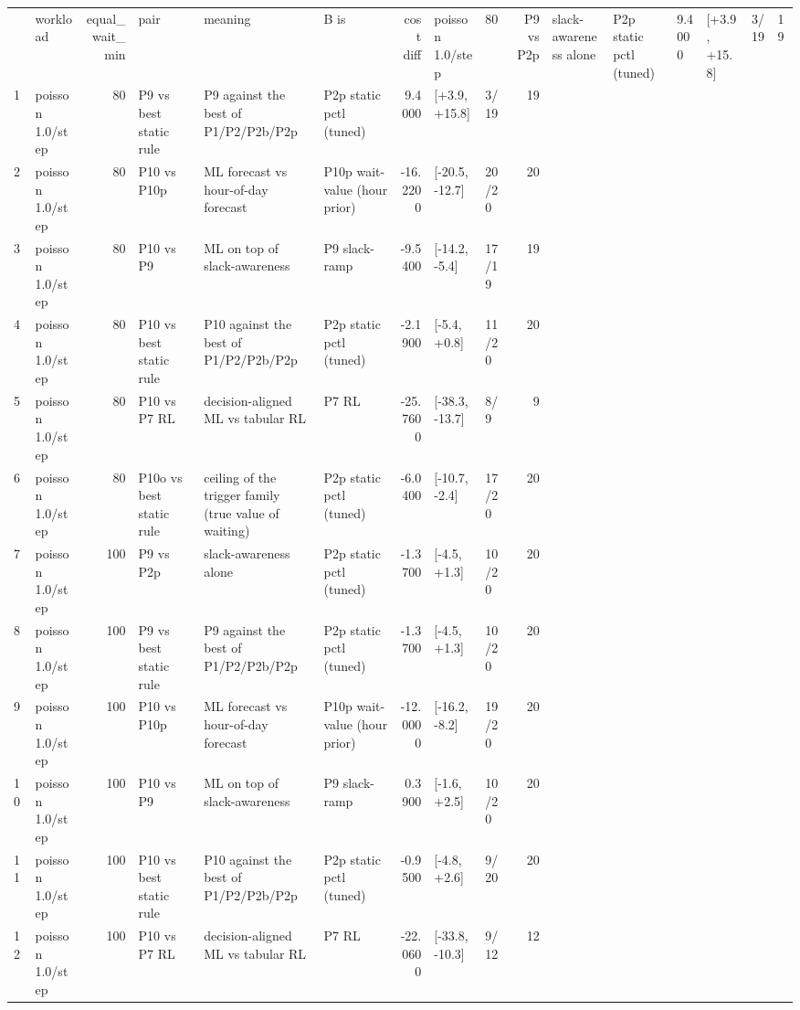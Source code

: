 \begin{tabular}{llrlllrllr}
\toprule
 & workload & equal_wait_min & pair & meaning & B is & cost diff %
 & poisson 1.0/step & 80 & P9 vs P2p & slack-awareness alone & P2p static pctl (tuned) & 9.4000 & [+3.9, +15.8] & 3/19 & 19 \\
1 & poisson 1.0/step & 80 & P9 vs best static rule & P9 against the best of P1/P2/P2b/P2p & P2p static pctl (tuned) & 9.4000 & [+3.9, +15.8] & 3/19 & 19 \\
2 & poisson 1.0/step & 80 & P10 vs P10p & ML forecast vs hour-of-day forecast & P10p wait-value (hour prior) & -16.2200 & [-20.5, -12.7] & 20/20 & 20 \\
3 & poisson 1.0/step & 80 & P10 vs P9 & ML on top of slack-awareness & P9 slack-ramp & -9.5400 & [-14.2, -5.4] & 17/19 & 19 \\
4 & poisson 1.0/step & 80 & P10 vs best static rule & P10 against the best of P1/P2/P2b/P2p & P2p static pctl (tuned) & -2.1900 & [-5.4, +0.8] & 11/20 & 20 \\
5 & poisson 1.0/step & 80 & P10 vs P7 RL & decision-aligned ML vs tabular RL & P7 RL & -25.7600 & [-38.3, -13.7] & 8/9 & 9 \\
6 & poisson 1.0/step & 80 & P10o vs best static rule & ceiling of the trigger family (true value of waiting) & P2p static pctl (tuned) & -6.0400 & [-10.7, -2.4] & 17/20 & 20 \\
7 & poisson 1.0/step & 100 & P9 vs P2p & slack-awareness alone & P2p static pctl (tuned) & -1.3700 & [-4.5, +1.3] & 10/20 & 20 \\
8 & poisson 1.0/step & 100 & P9 vs best static rule & P9 against the best of P1/P2/P2b/P2p & P2p static pctl (tuned) & -1.3700 & [-4.5, +1.3] & 10/20 & 20 \\
9 & poisson 1.0/step & 100 & P10 vs P10p & ML forecast vs hour-of-day forecast & P10p wait-value (hour prior) & -12.0000 & [-16.2, -8.2] & 19/20 & 20 \\
10 & poisson 1.0/step & 100 & P10 vs P9 & ML on top of slack-awareness & P9 slack-ramp & 0.3900 & [-1.6, +2.5] & 10/20 & 20 \\
11 & poisson 1.0/step & 100 & P10 vs best static rule & P10 against the best of P1/P2/P2b/P2p & P2p static pctl (tuned) & -0.9500 & [-4.8, +2.6] & 9/20 & 20 \\
12 & poisson 1.0/step & 100 & P10 vs P7 RL & decision-aligned ML vs tabular RL & P7 RL & -22.0600 & [-33.8, -10.3] & 9/12 & 12 \\

\end{tabular}
